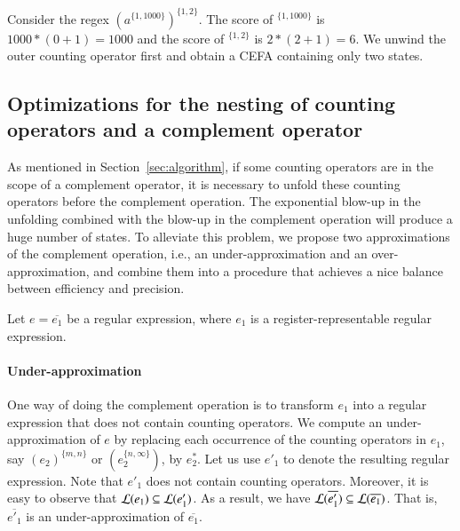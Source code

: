 {\begin{example}
 Consider the regex $(a^{\{1,1000\}})^{\{1,2\}}$. The score of $^{\{1,1000\}}$ is $1000*(0+1) = 1000$ and the score of $^{\{1,2\}}$ is $2*(2+1) = 6$. We unwind the outer counting operator first and obtain a CEFA containing only two states.  
\end{example}
}



\subsection{Optimizations for the nesting of counting operators and a complement operator}

As mentioned in Section~\ref{sec:algorithm}, if some counting operators are in the scope of a complement operator, it is necessary to unfold these counting operators before the complement operation. The exponential blow-up in the unfolding combined with the blow-up in the complement operation will produce a huge number of states. To alleviate this problem, we propose two approximations of the complement operation, i.e., an under-approximation and an over-approximation, and combine them into a procedure that achieves a nice balance between efficiency and precision. 

Let $e = \overline{e_1}$ be a regular expression, where $e_1$ is a register-representable regular expression. 

\paragraph*{Under-approximation}
%
One way of doing the complement operation is to transform $e_1$ into a regular expression that does not contain counting operators. We compute an under-approximation of $e$ by replacing each occurrence of the counting operators in $e_1$, say $(e_2)^{\{m,n\}}$ or $(e_2^{\{n, \infty\}})$, by $e_2^*$. Let us use $e'_1$ to denote the resulting regular expression. Note that $e'_1$ does not contain counting operators. Moreover, it is easy to observe that $\mathcal{L}(e_1) \subseteq \mathcal{L}(e'_1)$. As a result, we have $\mathcal{L}(\overline{e'_1}) \subseteq \mathcal{L}(\overline{e_1})$. That is, $\overline{e'_1}$ is an under-approximation of $\overline{e_1}$. 


